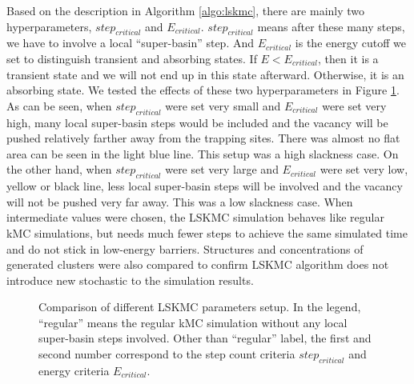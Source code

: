 Based on the description in Algorithm \ref{algo:lskmc}, there are mainly two hyperparameters, $step_{critical}$ and $E_{critical}$. $step_{critical}$ means after these many steps, we have to involve a local ``super-basin'' step. And $E_{critical}$ is the energy cutoff we set to distinguish transient and absorbing states. If $E < E_{critical}$, then it is a transient state and we will not end up in this state afterward. Otherwise, it is an absorbing state. We tested the effects of these two hyperparameters in Figure \ref{Chap:Al/Vac:fig:lskmc_time}. As can be seen, when $step_{critical}$ were set very small and $E_{critical}$ were set very high, many local super-basin steps would be included and the vacancy will be pushed relatively farther away from the trapping sites. There was almost no flat area can be seen in the light blue line. This setup was a high slackness case. On the other hand, when $step_{critical}$ were set very large and $E_{critical}$ were set very low, yellow or black line, less local super-basin steps will be involved and the vacancy will not be pushed very far away. This was a low slackness case. When intermediate values were chosen, the \ac{LSKMC} simulation behaves like regular \ac{kMC} simulations, but needs much fewer steps to achieve the same simulated time and do not stick in low-energy barriers.  Structures and concentrations of generated clusters were also compared to confirm \ac{LSKMC} algorithm does not introduce new stochastic to the simulation results.

\begingroup
\begin{figure}[!ht]
  \centering
\caption[Comparison of different \acf{LSKMC} parameters setup.]{Comparison of different \ac{LSKMC} parameters setup. In the legend, ``regular'' means the regular \ac{kMC} simulation without any local super-basin steps involved. Other than ``regular'' label, the first and second number correspond to the step count criteria $step_{critical}$ and energy criteria $E_{critical}$.}
\label{Chap:Al/Vac:fig:lskmc_time}
\end{figure}
\endgroup


